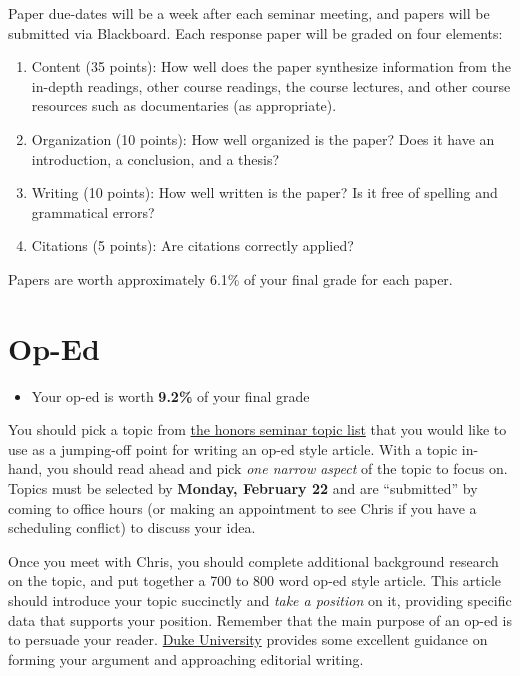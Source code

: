 \documentclass[
]{book}
\providecommand{\tightlist}{%
  \setlength{\itemsep}{0pt}\setlength{\parskip}{0pt}}
\newenvironment{rmdblock}[1]
  {\begin{shaded*}
  \begin{itemize}
  \renewcommand{\labelitemi}{
    \raisebox{-.7\height}[0pt][0pt]{
      {\setkeys{Gin}{width=3em,keepaspectratio}\texttt{[image: images/\#1]}}
    }
  }
  \item
  }
  {
  \end{itemize}
  \end{shaded*}
  }
\newenvironment{rmdtip}
  {\begin{rmdblock}{tip}}
  {\end{rmdblock}}
\begin{document}
Paper due-dates will be a week after each seminar meeting, and papers will be submitted via Blackboard. Each response paper will be graded on four elements:

\begin{enumerate}
\def\labelenumi{\arabic{enumi}.}
\tightlist
\item
  Content (35 points): How well does the paper synthesize information from the in-depth readings, other course readings, the course lectures, and other course resources such as documentaries (as appropriate).
\item
  Organization (10 points): How well organized is the paper? Does it have an introduction, a conclusion, and a thesis?
\item
  Writing (10 points): How well written is the paper? Is it free of spelling and grammatical errors?
\item
  Citations (5 points): Are citations correctly applied?
\end{enumerate}

Papers are worth approximately 6.1\% of your final grade for each paper.

\hypertarget{op-ed}{%
\section{Op-Ed}\label{op-ed}}

\begin{rmdtip}
Your op-ed is worth \textbf{9.2\%} of your final grade
\end{rmdtip}

You should pick a topic from \href{/honors-seminar-topics.html}{the honors seminar topic list} that you would like to use as a jumping-off point for writing an op-ed style article. With a topic in-hand, you should read ahead and pick \emph{one narrow aspect} of the topic to focus on. Topics must be selected by \textbf{Monday, February 22} and are ``submitted'' by coming to office hours (or making an appointment to see Chris if you have a scheduling conflict) to discuss your idea.

Once you meet with Chris, you should complete additional background research on the topic, and put together a 700 to 800 word op-ed style article. This article should introduce your topic succinctly and \emph{take a position} on it, providing specific data that supports your position. Remember that the main purpose of an op-ed is to persuade your reader. \href{https://styleguide.duke.edu/toolkits/writing-media/how-to-write-an-op-ed-article/}{Duke University} provides some excellent guidance on forming your argument and approaching editorial writing.
\end{document}
